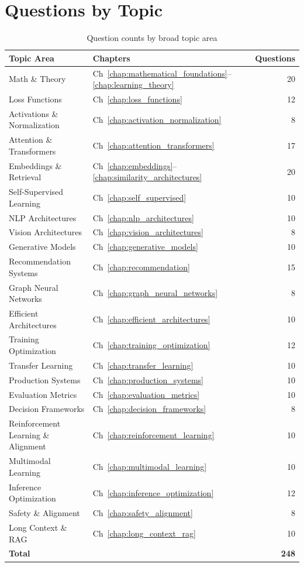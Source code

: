 \section{Questions by Topic}
\label{sec:qi_by_topic}

\begin{table}[H]
\centering
\caption{Question counts by broad topic area}
\begin{tabularx}{\textwidth}{Xlr}
\toprule
\textbf{Topic Area} & \textbf{Chapters} & \textbf{Questions} \\
\midrule
Math \& Theory & Ch~\ref{chap:mathematical_foundations}--\ref{chap:learning_theory} & 20 \\
Loss Functions & Ch~\ref{chap:loss_functions} & 12 \\
Activations \& Normalization & Ch~\ref{chap:activation_normalization} & 8 \\
Attention \& Transformers & Ch~\ref{chap:attention_transformers} & 17 \\
Embeddings \& Retrieval & Ch~\ref{chap:embeddings}--\ref{chap:similarity_architectures} & 20 \\
Self-Supervised Learning & Ch~\ref{chap:self_supervised} & 10 \\
NLP Architectures & Ch~\ref{chap:nlp_architectures} & 10 \\
Vision Architectures & Ch~\ref{chap:vision_architectures} & 8 \\
Generative Models & Ch~\ref{chap:generative_models} & 10 \\
Recommendation Systems & Ch~\ref{chap:recommendation} & 15 \\
Graph Neural Networks & Ch~\ref{chap:graph_neural_networks} & 8 \\
Efficient Architectures & Ch~\ref{chap:efficient_architectures} & 10 \\
Training Optimization & Ch~\ref{chap:training_optimization} & 12 \\
Transfer Learning & Ch~\ref{chap:transfer_learning} & 10 \\
Production Systems & Ch~\ref{chap:production_systems} & 10 \\
Evaluation Metrics & Ch~\ref{chap:evaluation_metrics} & 10 \\
Decision Frameworks & Ch~\ref{chap:decision_frameworks} & 8 \\
Reinforcement Learning \& Alignment & Ch~\ref{chap:reinforcement_learning} & 10 \\
Multimodal Learning & Ch~\ref{chap:multimodal_learning} & 10 \\
Inference Optimization & Ch~\ref{chap:inference_optimization} & 12 \\
Safety \& Alignment & Ch~\ref{chap:safety_alignment} & 8 \\
Long Context \& RAG & Ch~\ref{chap:long_context_rag} & 10 \\
\midrule
\textbf{Total} & & \textbf{248} \\
\bottomrule
\end{tabularx}
\end{table}

